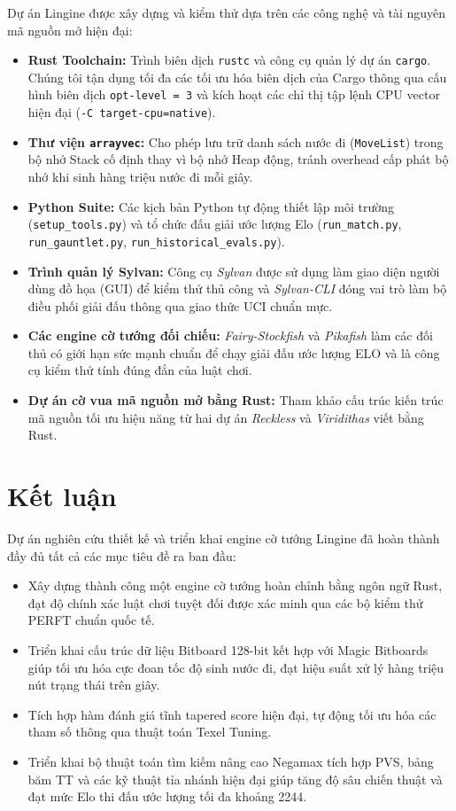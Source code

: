 Dự án Lingine được xây dựng và kiểm thử dựa trên các công nghệ và tài nguyên mã nguồn mở hiện đại:
\begin{itemize}
    \item \textbf{Rust Toolchain:} Trình biên dịch \texttt{rustc} và công cụ quản lý dự án \texttt{cargo}. Chúng tôi tận dụng tối đa các tối ưu hóa biên dịch của Cargo thông qua cấu hình biên dịch \texttt{opt-level = 3} và kích hoạt các chỉ thị tập lệnh CPU vector hiện đại (\texttt{-C target-cpu=native}).
    \item \textbf{Thư viện \texttt{arrayvec}:} Cho phép lưu trữ danh sách nước đi (\texttt{MoveList}) trong bộ nhớ Stack cố định thay vì bộ nhớ Heap động, tránh overhead cấp phát bộ nhớ khi sinh hàng triệu nước đi mỗi giây.
    \item \textbf{Python Suite:} Các kịch bản Python tự động thiết lập môi trường (\texttt{setup\_}\allowbreak\texttt{tools.py}) và tổ chức đấu giải ước lượng Elo (\texttt{run\_}\allowbreak\texttt{match.py}, \texttt{run\_}\allowbreak\texttt{gauntlet.py}, \texttt{run\_}\allowbreak\texttt{historical\_}\allowbreak\texttt{evals.py}).
    \item \textbf{Trình quản lý Sylvan:} Công cụ \textit{Sylvan} được sử dụng làm giao diện người dùng đồ họa (GUI) để kiểm thử thủ công và \textit{Sylvan-CLI} đóng vai trò làm bộ điều phối giải đấu thông qua giao thức UCI chuẩn mực.
    \item \textbf{Các engine cờ tướng đối chiếu:} \textit{Fairy-Stockfish} và \textit{Pikafish} làm các đối thủ có giới hạn sức mạnh chuẩn để chạy giải đấu ước lượng ELO và là công cụ kiểm thử tính đúng đắn của luật chơi.
    \item \textbf{Dự án cờ vua mã nguồn mở bằng Rust:} Tham khảo cấu trúc kiến trúc mã nguồn tối ưu hiệu năng từ hai dự án \textit{Reckless} và \textit{Viridithas} viết bằng Rust.
\end{itemize}

\section{Kết luận}

Dự án nghiên cứu thiết kế và triển khai engine cờ tướng Lingine đã hoàn thành đầy đủ tất cả các mục tiêu đề ra ban đầu:
\begin{itemize}
    \item Xây dựng thành công một engine cờ tướng hoàn chỉnh bằng ngôn ngữ Rust, đạt độ chính xác luật chơi tuyệt đối được xác minh qua các bộ kiểm thử PERFT chuẩn quốc tế.
    \item Triển khai cấu trúc dữ liệu Bitboard 128-bit kết hợp với Magic Bitboards giúp tối ưu hóa cực đoan tốc độ sinh nước đi, đạt hiệu suất xử lý hàng triệu nút trạng thái trên giây.
    \item Tích hợp hàm đánh giá tĩnh tapered score hiện đại, tự động tối ưu hóa các tham số thông qua thuật toán Texel Tuning.
    \item Triển khai bộ thuật toán tìm kiếm nâng cao Negamax tích hợp PVS, bảng băm TT và các kỹ thuật tỉa nhánh hiện đại giúp tăng độ sâu chiến thuật và đạt mức Elo thi đấu ước lượng tối đa khoảng 2244.
\end{itemize}

